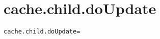 \section{cache.child.doUpdate}
\label{configuration:CacheChildDoUpdate}
\AvailableInCsharpOnly{\TODO}
\begin{lstlisting}[style=Props,caption={Usage example for \textit{cache.child.doUpdate}}]
cache.child.doUpdate=
\end{lstlisting}